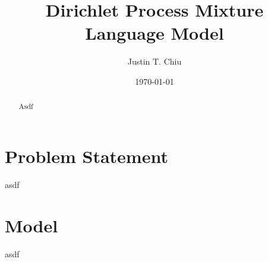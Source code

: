 \documentclass[12pt]{article}
\title{Dirichlet Process Mixture Language Model}
\author{
Justin T. Chiu
}
\date{\today}
\begin{document}
\maketitle

\begin{abstract}
Asdf
\end{abstract}

\section{Problem Statement}
asdf

\section{Model}
asdf



\end{document}
